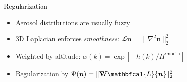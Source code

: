 \documentclass[compress,red,12pt]{beamer}
\newcommand{\Laplacian}{\mathbfcal{L}}
\begin{document}
\begin{frame}[label=regularization]{Regularization}
  \begin{itemize}
  \item Aerosol distributions are usually fuzzy
  \item 3D Laplacian enforces {\em smoothness}: $\Laplacian{\bm n} = \| \nabla^2{\bm  n}\|^2_2$
  \item Weighted by altitude: $w(k)=\exp\left[-h(k)/H^\mathrm{smooth}\right]$
  \item Regularization by $\Psi({\bm n}) = \| {\bf W} \Laplacian{\bm n}\|^2_2$
  \end{itemize}

  \hfill\hyperlink{objective<3>}{}
\end{frame}

\end{document}
